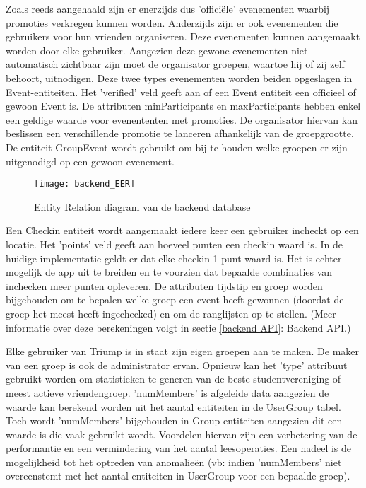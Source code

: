 Zoals reeds aangehaald zijn er enerzijds dus 'officiële' evenementen waarbij promoties verkregen kunnen worden. Anderzijds zijn er ook evenementen die gebruikers voor hun vrienden organiseren. Deze evenementen kunnen aangemaakt worden door elke gebruiker. Aangezien deze gewone evenementen niet automatisch zichtbaar zijn moet de organisator groepen, waartoe hij of zij zelf behoort, uitnodigen. 
Deze twee types evenementen worden beiden opgeslagen in Event-entiteiten. Het 'verified' veld geeft aan of een Event entiteit een officieel of gewoon Event is. De attributen minParticipants en maxParticipants hebben enkel een geldige waarde voor evenententen met promoties. De organisator hiervan kan beslissen een verschillende promotie te lanceren afhankelijk van de groepgrootte. De entiteit GroupEvent wordt gebruikt om bij te houden welke groepen er zijn uitgenodigd op een gewoon evenement.


\begin{figure}[H]
	\texttt{[image: backend\_EER]}
	\caption{Entity Relation diagram van de backend database}
	\label{fig:Backend ER}
\end{figure}


Een Checkin entiteit wordt aangemaakt iedere keer een gebruiker incheckt op een locatie. Het 'points' veld geeft aan hoeveel punten een checkin waard is. In de huidige implementatie geldt er dat elke checkin 1 punt waard is. Het is echter mogelijk de app uit te breiden en te voorzien dat bepaalde combinaties van inchecken meer punten opleveren. De attributen tijdstip en groep worden bijgehouden om te bepalen welke groep een event heeft gewonnen (doordat de groep het meest heeft ingechecked) en om de ranglijsten op te stellen. (Meer informatie over deze berekeningen volgt in sectie \ref{backend API}: Backend API.)


Elke gebruiker van Triump is in staat zijn eigen groepen aan te maken. De maker van een groep is ook de administrator ervan. Opnieuw kan het 'type' attribuut gebruikt worden om statistieken te generen van de beste studentvereniging of meest actieve vriendengroep. 'numMembers' is afgeleide data aangezien de waarde kan berekend worden uit het aantal entiteiten in de UserGroup tabel. Toch wordt 'numMembers' bijgehouden in Group-entiteiten aangezien dit een waarde is die vaak gebruikt wordt. Voordelen hiervan zijn een verbetering van de performantie en een vermindering van het aantal leesoperaties. Een nadeel is de mogelijkheid tot het optreden van anomalieën (vb: indien 'numMembers' niet overeenstemt met het aantal entiteiten in UserGroup voor een bepaalde groep).

